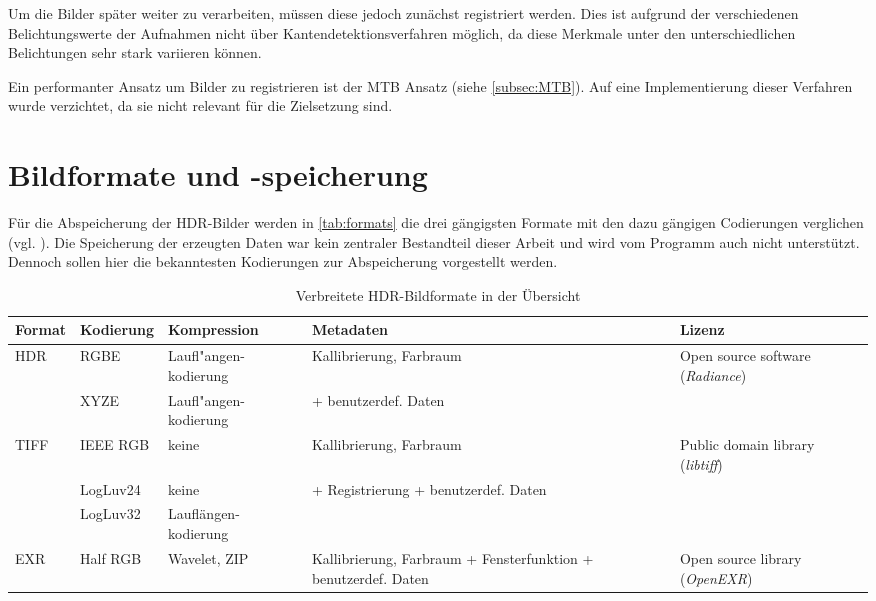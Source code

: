 Um die Bilder später weiter zu verarbeiten, müssen diese jedoch zunächst registriert werden. Dies ist aufgrund der verschiedenen Belichtungswerte der Aufnahmen nicht über Kantendetektionsverfahren möglich, da diese Merkmale unter den unterschiedlichen Belichtungen sehr stark variieren können.

Ein performanter Ansatz um Bilder zu registrieren ist der \gls{MTB} Ansatz (siehe \autoref{subsec:MTB}). Auf eine Implementierung dieser Verfahren wurde verzichtet, da sie nicht relevant für die Zielsetzung sind.

\section{Bildformate und -speicherung}

Für die Abspeicherung der \gls{HDR}-Bilder werden in \autoref{tab:formats} die drei gängigsten Formate mit den dazu gängigen Codierungen verglichen (vgl. \cite{Reinhard}). Die Speicherung der erzeugten Daten war kein zentraler Bestandteil dieser Arbeit und wird vom Programm auch nicht unterstützt. Dennoch sollen hier die bekanntesten Kodierungen zur Abspeicherung vorgestellt werden.

\begin{table}
  \begin{center}
    \begin{tabularx}{\textwidth}{l|XXXX}
	\toprule
	Format & Kodierung & Kompression & Metadaten & Lizenz \\
	\midrule
	HDR & RGBE & Laufl"angen-\newline kodierung & Kallibrierung, \newline Farbraum & Open source software (\textit{Radiance})\\
	& XYZE & Laufl"angen-\newline kodierung & + benutzerdef. Daten & \\
	\midrule
	TIFF & IEEE RGB & keine & Kallibrierung, \newline Farbraum & Public domain library (\textit{libtiff})\\
	& LogLuv24 & keine & + Registrierung \newline + benutzerdef. Daten& \\
	& LogLuv32 & Lauflängen-\newline kodierung & & \\
	\midrule
	EXR & Half RGB & Wavelet, ZIP & Kallibrierung, \newline Farbraum \newline+ Fensterfunktion \newline + benutzerdef. Daten & Open source library (\textit{OpenEXR})\\
	\bottomrule
    \end{tabularx}
    \caption{Verbreitete HDR-Bildformate in der Übersicht \cite[S.89]{Reinhard}}
    \label{tab:formats}
  \end{center}
\end{table}

